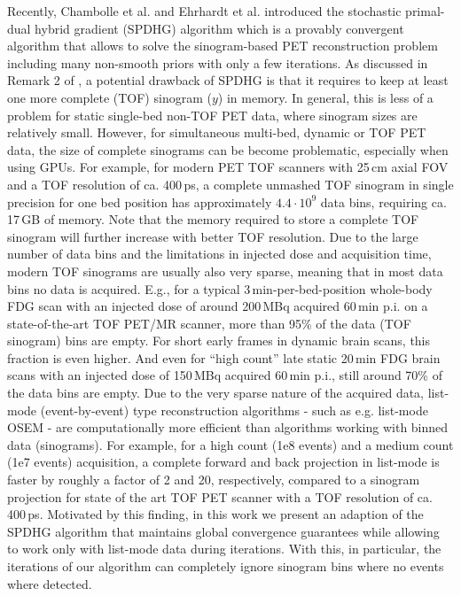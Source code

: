 \documentclass{IEEEtran}
\begin{document}
Recently, Chambolle et al. \cite{Chambolle2018} and  Ehrhardt et al. \cite{Ehrhardt2019} introduced 
the stochastic primal-dual hybrid gradient (SPDHG) algorithm which is a provably convergent algorithm
that allows to solve the sinogram-based PET reconstruction problem including many non-smooth priors with
only a few iterations.
As discussed in Remark 2 of \cite{Ehrhardt2019}, a potential drawback of SPDHG is that it requires
to keep at least one more complete (TOF) sinogram ($y$) in memory. 
In general, this is less of a problem for static single-bed non-TOF PET data, where sinogram sizes
are relatively small.
However, for simultaneous multi-bed, dynamic or TOF PET data, the size of complete sinograms
can be become problematic, especially when using GPUs.
For example, for modern PET TOF scanners with 25\,cm axial FOV and a TOF resolution of ca. 400\,ps, 
a complete unmashed TOF sinogram in single precision for one bed position 
has approximately $4.4\cdot10^9$ data bins, requiring ca. 17\,GB of memory.
Note that the memory required to store a complete TOF sinogram will further 
increase with better TOF resolution.
Due to the large number of data bins and the limitations in injected dose and acquisition time,
modern TOF sinograms are usually also very sparse, meaning that in most data bins no data is
acquired.
E.g., for a typical 3\,min-per-bed-position whole-body FDG scan with an injected dose 
of around 200\,MBq acquired 60\,min p.i. on a state-of-the-art TOF PET/MR scanner, 
more than 95\% of the data (TOF sinogram) bins are empty.
For short early frames in dynamic brain scans, this fraction is even higher.
And even for ``high count'' late static 20\,min FDG brain scans with an injected dose of 150\,MBq
acquired 60\,min p.i., still around 70\% of the data bins are empty.
Due to the very sparse nature of the acquired data, list-mode (event-by-event) type
reconstruction algorithms - such as e.g. list-mode OSEM - are computationally more efficient
than algorithms working with binned data (sinograms).
For example, for a high count (1e8 events) and a medium count (1e7 events) acquisition, 
a complete forward and back projection in list-mode is faster by roughly a factor of 2 and 20,
respectively, compared to a sinogram projection for state of the art TOF PET scanner 
with a TOF resolution of ca. 400\,ps.
Motivated by this finding, 
in this work we present an adaption of the SPDHG algorithm that maintains global convergence guarantees while allowing to work only with list-mode data during iterations.
With this, in particular, the iterations of our algorithm can completely ignore sinogram bins where no events where detected.
\end{document}

